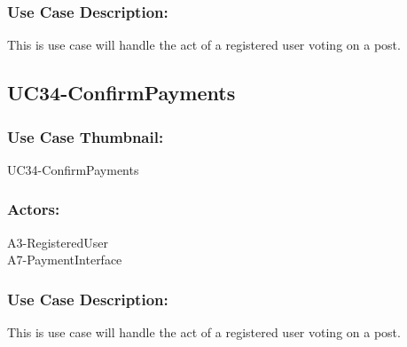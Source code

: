 \documentclass[11pt, openany]{report}
\begin{document}
\subsubsection*{Use Case Description:}
This is use case will handle the act of a registered user voting on a post.

\subsection{UC34-ConfirmPayments}
\label{sUC34}
\subsubsection*{Use Case Thumbnail:}
UC34-ConfirmPayments
\subsubsection*{Actors:}
A3-RegisteredUser\\
A7-PaymentInterface\\
\subsubsection*{Use Case Description:}
This is use case will handle the act of a registered user voting on a post.
\end{document}
